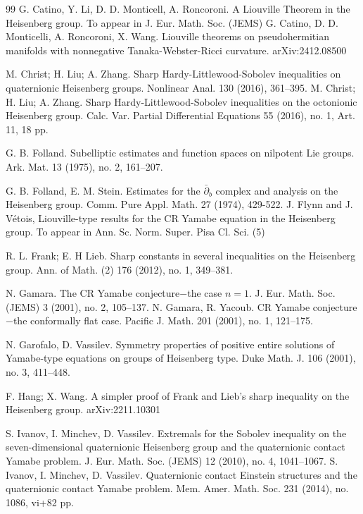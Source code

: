 \documentclass[reqno,12pt]{amsart}
\numberwithin{equation}{section}
\theoremstyle{plain}
\theoremstyle{definition}
\begin{document}
    


\begin{thebibliography}{99}
G. Catino, Y. Li, D. D. Monticell, A. Roncoroni. A Liouville Theorem in the Heisenberg group. To appear in J. Eur. Math. Soc. (JEMS)
G. Catino, D. D. Monticelli, A. Roncoroni, X. Wang.  Liouville theorems on pseudohermitian manifolds with nonnegative Tanaka-Webster-Ricci curvature. arXiv:2412.08500


M. Christ; H. Liu; A. Zhang. Sharp Hardy-Littlewood-Sobolev inequalities on quaternionic Heisenberg groups.
Nonlinear Anal. 130 (2016), 361–395.
M. Christ; H. Liu; A. Zhang.
Sharp Hardy-Littlewood-Sobolev inequalities on the octonionic Heisenberg group.
Calc. Var. Partial Differential Equations 55 (2016), no. 1, Art. 11, 18 pp.

G. B. Folland.
Subelliptic estimates and function spaces on nilpotent Lie groups.
Ark. Mat.   13 (1975), no. 2, 161–207.


G. B. Folland, E. M. Stein. Estimates for the $\bar{\partial}_b$ complex and analysis on the Heisenberg group. Comm. Pure Appl. Math. 27 (1974), 429-522.
J. Flynn and J. Vétois, Liouville-type results for the CR Yamabe equation in the Heisenberg group. To appear in
Ann. Sc. Norm. Super. Pisa Cl. Sci. (5)  



R. L. Frank; E. H Lieb.
Sharp constants in several inequalities on the Heisenberg group.
Ann. of Math. (2) 176 (2012), no. 1, 349–381.




N. Gamara.
The CR Yamabe conjecture$-$the case $n=1$.
J. Eur. Math. Soc. (JEMS)   3 (2001), no. 2, 105–137.
N. Gamara, R. Yacoub.
CR Yamabe conjecture$-$the conformally flat case.
Pacific J. Math.   201 (2001), no. 1, 121–175.

N. Garofalo, D. Vassilev. Symmetry properties of positive entire solutions of Yamabe-type equations on groups of Heisenberg type.
Duke Math. J.   106 (2001), no. 3, 411–448.


F. Hang; X. Wang. A simpler proof of Frank and Lieb's sharp inequality on the Heisenberg group. arXiv:2211.10301

S. Ivanov, I. Minchev, D. Vassilev. Extremals for the Sobolev inequality on the seven-dimensional quaternionic Heisenberg group and the quaternionic contact Yamabe problem.
J. Eur. Math. Soc. (JEMS)   12 (2010), no. 4, 1041–1067.
S. Ivanov, I. Minchev, D. Vassilev.
Quaternionic contact Einstein structures and the quaternionic contact Yamabe problem.
Mem. Amer. Math. Soc.   231 (2014), no. 1086, vi+82 pp.




\end{thebibliography}
\end{document}
